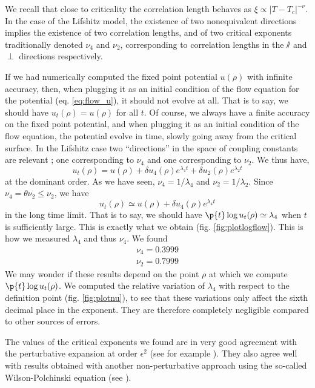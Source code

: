 We recall that close to criticality the correlation length behaves as $\xi \propto |T - T_c|^{-\nu}$. 
In the case of the Lifshitz model, the existence of two nonequivalent directions implies the existence of two correlation lengths, and of two critical exponents traditionally denoted $\nu_4$ and $\nu_2$, corresponding to correlation lengths in the $\sslash$ and $\perp$ directions respectively. 

If we had numerically computed the fixed point potential $u(\rho)$ with infinite accuracy, then, when plugging it as an initial condition of the flow equation for the potential (eq. \ref{eq:flow_u}), it should not evolve at all. That is to say, we should have $u_t(\rho) = u(\rho)$ for all $t$. 
Of course, we always have a finite accuracy on the fixed point potential, and when plugging it as an initial condition of the flow equation, the potential evolve in time, slowly going away from the critical surface. In the Lifshitz case two ``directions'' in the space of coupling constants are relevant ; one corresponding to $\nu_4$ and one corresponding to $\nu_2$. We thus have, 
\begin{equation}
u_t(\rho) = u(\rho) + \delta u_4(\rho) e^{\lambda_4 t} + \delta u_2(\rho) e^{\lambda_2 t}
\end{equation}
at the dominant order.
As we have seen, $\nu_4 = 1/\lambda_4$ and $\nu_2 = 1/\lambda_2$. Since $\nu_4 = \theta \nu_2 \leq \nu_2$, we have
\begin{equation}
u_t(\rho) \simeq u(\rho) + \delta u_4(\rho) e^{\lambda_4 t} 
\end{equation}
in the long time limit. That is to say, we should have $\p{t} \log{u_t(\rho)} \simeq \lambda_4$ when $t$ is sufficiently large. This is exactly what we obtain (fig. \ref{fig:plotlogflow}).
This is how we measured $\lambda_4$ and thus $\nu_4$. We found 
\begin{align}
\nu_4 = 0.3999 \\
\nu_2 = 0.7999
\end{align}
We may wonder if these results depend on the point $\rho$ at which we compute $\p{t} \log{u_t(\rho)}$. We computed the relative variation of $\lambda_4$ with respect to the definition point (fig. \ref{fig:plotnu}), to see that these variations only affect the sixth decimal place in the exponent. They are therefore completely negligible compared to other sources of errors.

The values of the critical exponents we found are in very good agreement with the perturbative expansion at order $\epsilon^2$ (see for example \cite{MouhannaLif}).
They also agree well with results obtained with another non-perturbative approach using the so-called Wilson-Polchinski equation (see \cite{BervillierLif}). 


